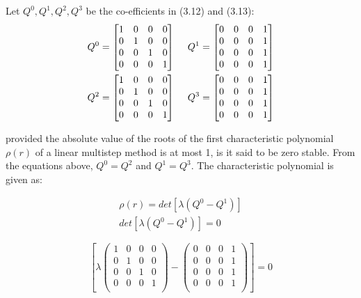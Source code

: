 \documentclass[12pt]{report}
\begin{document}
Let $Q^0, Q^1, Q^2, Q^3$ be the co-efficients in (3.12) and (3.13):
\begin{align}
Q^0 = \begin{bmatrix}
1 & 0 & 0 & 0\\
0 & 1 & 0 & 0\\
0 & 0 & 1 & 0\\
0 & 0 & 0 & 1
\end{bmatrix} 
& \hspace{5mm} Q^1 = \begin{bmatrix}
0 & 0 & 0 & 1\\
0 & 0 & 0 & 1\\
0 & 0 & 0 & 1\\
0 & 0 & 0 & 1
\end{bmatrix} \\
Q^2 = \begin{bmatrix}
1 & 0 & 0 & 0\\
0 & 1 & 0 & 0\\
0 & 0 & 1 & 0\\
0 & 0 & 0 & 1
\end{bmatrix} 
& \hspace{5mm} Q^3 = \begin{bmatrix}
0 & 0 & 0 & 1\\
0 & 0 & 0 & 1\\
0 & 0 & 0 & 1\\
0 & 0 & 0 & 1
\end{bmatrix}
\end{align}

\noindent provided the absolute value of the roots of the first characteristic polynomial $\rho (r) $ of a linear multistep method is at most 1, is it said to be zero stable. From the equations above, $Q^0 = Q^2$ and $Q^1 = Q^3$. The characteristic polynomial is given as:

\begin{equation}
\begin{array}{l}
\rho (r) = det [\lambda(Q^0 - Q^1)] \\
det [\lambda(Q^0 - Q^1)] = 0
\end{array}
\end{equation}

\[ 
\left[
\lambda \left(\begin{array}{cccc}
1 & 0 & 0 & 0 \\
0 & 1 & 0 & 0 \\
0 & 0 & 1 & 0 \\
0 & 0 & 0 & 1\\
\end{array} \right) -
\left(\begin{array}{cccc}
0 & 0 & 0 & 1 \\
0 & 0 & 0 & 1 \\
0 & 0 & 0 & 1 \\
0 & 0 & 0 & 1 \\
\end{array} \right)
\right] = 0
\]
\end{document}
